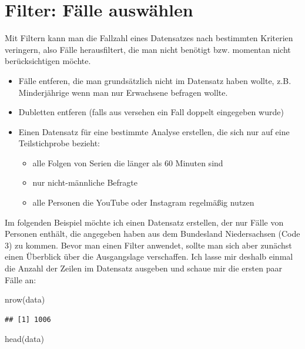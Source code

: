 \documentclass[
]{book}
\newenvironment{Shaded}{\begin{snugshade}}{\end{snugshade}}
\newcommand{\FunctionTok}[1]{\textcolor[rgb]{0.00,0.00,0.00}{#1}}
\newcommand{\NormalTok}[1]{#1}
\begin{document}
\hypertarget{filter-fuxe4lle-auswuxe4hlen}{%
\section{Filter: Fälle auswählen}\label{filter-fuxe4lle-auswuxe4hlen}}

Mit Filtern kann man die Fallzahl eines Datensatzes nach bestimmten Kriterien veringern, also Fälle herausfiltert, die man nicht benötigt bzw. momentan nicht berücksichtigen möchte.

\begin{itemize}
\item
  Fälle entferen, die man grundsätzlich nicht im Datensatz haben wollte, z.B. Minderjährige wenn man nur Erwachsene befragen wollte.
\item
  Dubletten entferen (falls aus versehen ein Fall doppelt eingegeben wurde)
\item
  Einen Datensatz für eine bestimmte Analyse erstellen, die sich nur auf eine Teilstichprobe bezieht:

  \begin{itemize}
  \item
    alle Folgen von Serien die länger als 60 Minuten sind
  \item
    nur nicht-männliche Befragte
  \item
    alle Personen die YouTube oder Instagram regelmäßig nutzen
  \end{itemize}
\end{itemize}

Im folgenden Beispiel möchte ich einen Datensatz erstellen, der nur Fälle von Personen enthält, die angegeben haben aus dem Bundesland Niedersachsen (Code 3) zu kommen. Bevor man einen Filter anwendet, sollte man sich aber zunächst einen Überblick über die Ausgangslage verschaffen. Ich lasse mir deshalb einmal die Anzahl der Zeilen im Datensatz ausgeben und schaue mir die ersten paar Fälle an:

\begin{Shaded}
\begin{Highlighting}[]
\FunctionTok{nrow}\NormalTok{(data)}
\end{Highlighting}
\end{Shaded}

\begin{verbatim}
## [1] 1006
\end{verbatim}

\begin{Shaded}
\begin{Highlighting}[]
\FunctionTok{head}\NormalTok{(data)}
\end{Highlighting}
\end{Shaded}
\end{document}
